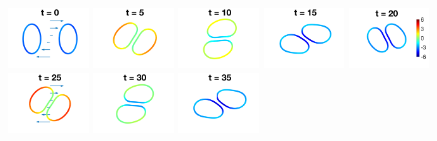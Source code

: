 \documentclass[prf,superscriptaddress,showkeys,longbibliography]{revtex4-1}
\begin{document}
\begin{figure}[htp]
  \includegraphics[width=0.19\textwidth]{figs/adR4em1adS2p1e0Chi5em1_ra090_image01.png}
  \includegraphics[width=0.19\textwidth]{figs/adR4em1adS2p1e0Chi5em1_ra090_image02.png}
  \includegraphics[width=0.19\textwidth]{figs/adR4em1adS2p1e0Chi5em1_ra090_image03.png}
  \includegraphics[width=0.19\textwidth]{figs/adR4em1adS2p1e0Chi5em1_ra090_image04.png}
  \includegraphics[width=0.19\textwidth]{figs/adR4em1adS2p1e0Chi5em1_ra090_image05.png}
  \includegraphics[width=0.19\textwidth]{figs/adR4em1adS2p1e0Chi5em1_ra090_image06.png}
  \includegraphics[width=0.19\textwidth]{figs/adR4em1adS2p1e0Chi5em1_ra090_image07.png}
  \includegraphics[width=0.19\textwidth]{figs/adR4em1adS2p1e0Chi5em1_ra090_image08.png}

\end{figure}
\end{document}
